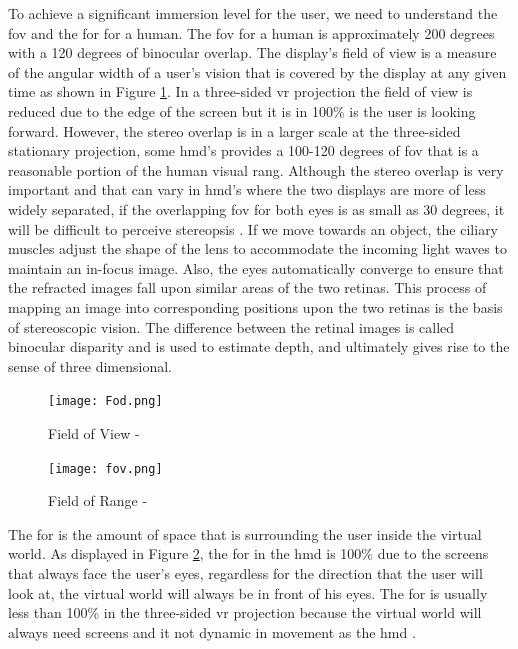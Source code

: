 To achieve a significant immersion level for the user, we need to understand the \acrfull{fov} and the \acrfull{for} for a human. The \acrshort{fov} for a human is approximately 200 degrees with a 120 degrees of binocular overlap. The display's field of view is a measure of the angular width of a user's vision that is covered by the display at any given time as shown in Figure \ref{fig:field}. In a three-sided \acrshort{vr} projection the field of view is reduced due to the edge of the screen but it is in 100\% is the user is looking forward. However, the stereo overlap is in a larger scale at the three-sided stationary projection, some \acrlong{hmd}'s provides a 100-120 degrees of \acrshort{fov} that is a reasonable portion of the human visual rang. Although the stereo overlap is very important and that can vary in \acrshort{hmd}'s where the two displays are more of less widely separated, if the overlapping  
\acrshort{fov} for both eyes is as small as 30 degrees, it will be difficult to perceive stereopsis \citep{William}.
If we move towards an object, the ciliary muscles adjust the shape of the lens to accommodate
the incoming light waves to maintain an in-focus image. Also, the eyes automatically
converge to ensure that the refracted images fall upon similar areas of the
two retinas. This process of mapping an image into corresponding positions upon the
two retinas is the basis of stereoscopic vision. The difference between the retinal images
is called binocular disparity and is used to estimate depth, and ultimately gives rise to
the sense of three dimensional\citep{Vince2011}.

\begin{figure}[ht]
    \centering
    \texttt{[image: Fod.png]}
    \caption{Field of View - \citep{William}}
    \label{fig:field}
\end{figure}


\begin{figure}[ht]
    \centering
    \texttt{[image: fov.png]}
    \caption{Field of Range - \citep{William}}
    \label{fig:fod}
\end{figure}

The \acrfull{for} is the amount of space that is surrounding the user inside the virtual world. As displayed in Figure \ref{fig:fod}, the \acrshort{for} in the \acrshort{hmd} is 100\% due to the screens that always face the user's eyes, regardless for the direction that the user will look at, the virtual world will always be in front of his eyes. The \acrshort{for} is usually less than 100\% in the three-sided \acrshort{vr} projection because the virtual world will always need screens and it not dynamic in movement as the \acrlong{hmd} \citep{William}.

